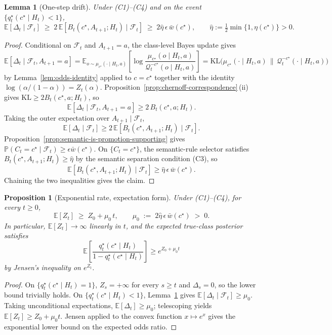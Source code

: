 \documentclass[11pt]{article}
\newtheorem{proposition}[theorem]{Proposition}
\newtheorem{lemma}[theorem]{Lemma}
\theoremstyle{definition}
\theoremstyle{remark}
\newcommand{\Qcal}{\mathcal{Q}}
\newcommand{\E}{\mathbb{E}}
\newcommand{\Prob}{\mathbb{P}}
\newcommand{\KL}{\mathrm{KL}}
\begin{document}
\begin{lemma}[One-step drift]
\label{lem:one-step-drift}
Under \textup{(C1)--(C4)} and on the event $\{q_t^\star(c^\star\mid H_t)<1\}$,
\[
\E[\Delta_t\mid\mathcal F_t]
\;\ge\;
2\,\E[B_t(c^\star,A_{t+1};H_t)\mid\mathcal F_t]
\;\ge\;
2\hat\eta\,\epsilon\,\bar w(c^\star),
\qquad
\hat\eta:=\tfrac{1}{2}\min\{1,\eta(c^\star)\}>0.
\]
\end{lemma}

\begin{proof}
Conditional on $\mathcal F_t$ and $A_{t+1}=a$, the class-level Bayes update gives
\[
\E[\Delta_t\mid\mathcal F_t,A_{t+1}=a]
=
\E_{o\sim\mu_{c^\star}(\cdot\mid H_t,a)}\!\left[
\log\frac{\mu_{c^\star}(o\mid H_t,a)}{\Qcal_t^{-c^\star}(o\mid H_t,a)}
\right]
=\KL\!\bigl(\mu_{c^\star}(\cdot\mid H_t,a)\,\|\,\Qcal_t^{-c^\star}(\cdot\mid H_t,a)\bigr)
\]
by Lemma~\ref{lem:odds-identity} applied to $c=c^\star$ together with the identity $\log(\alpha/(1-\alpha))=Z_t(\alpha)$. Proposition~\ref{prop:chernoff-correspondence}\,(ii) gives $\KL\ge 2B_t(c^\star,a;H_t)$, so
\[
\E[\Delta_t\mid\mathcal F_t,A_{t+1}=a]\ge 2\,B_t(c^\star,a;H_t).
\]
Taking the outer expectation over $A_{t+1}\mid\mathcal F_t$,
\[
\E[\Delta_t\mid\mathcal F_t]\ge 2\,\E[B_t(c^\star,A_{t+1};H_t)\mid\mathcal F_t].
\]
Proposition~\ref{prop:semantic-is-promotion-supporting} gives $\Prob(C_t=c^\star\mid\mathcal F_t)\ge\epsilon\bar w(c^\star)$. On $\{C_t=c^\star\}$, the semantic-rule selector satisfies $B_t(c^\star,A_{t+1};H_t)\ge\hat\eta$ by the semantic separation condition (C3), so
\[
\E[B_t(c^\star,A_{t+1};H_t)\mid\mathcal F_t]\ge\hat\eta\,\epsilon\,\bar w(c^\star).
\]
Chaining the two inequalities gives the claim.
\end{proof}

\begin{proposition}[Exponential rate, expectation form]
\label{prop:exp-rate}
Under \textup{(C1)--(C4)}, for every $t\ge 0$,
\[
\E[Z_t]\;\ge\;Z_0+\mu_0\,t,
\qquad
\mu_0\;:=\;2\hat\eta\,\epsilon\,\bar w(c^\star)\;>\;0.
\]
In particular, $\E[Z_t]\to\infty$ linearly in $t$, and the expected true-class posterior satisfies
\[
\E\!\left[\frac{q_t^\star(c^\star\mid H_t)}{1-q_t^\star(c^\star\mid H_t)}\right]\ge e^{Z_0+\mu_0 t}
\]
by Jensen's inequality on $e^{Z_t}$.
\end{proposition}

\begin{proof}
On $\{q_t^\star(c^\star\mid H_t)=1\}$, $Z_{s}=+\infty$ for every $s\ge t$ and $\Delta_s=0$, so the lower bound trivially holds. On $\{q_t^\star(c^\star\mid H_t)<1\}$, Lemma~\ref{lem:one-step-drift} gives $\E[\Delta_t\mid\mathcal F_t]\ge\mu_0$. Taking unconditional expectations, $\E[\Delta_t]\ge\mu_0$; telescoping yields $\E[Z_t]\ge Z_0+\mu_0 t$. Jensen applied to the convex function $x\mapsto e^x$ gives the exponential lower bound on the expected odds ratio.
\end{proof}
\end{document}
